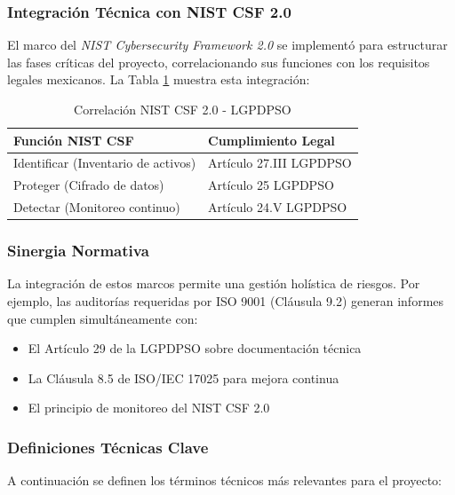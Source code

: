 \subsubsection{Integración Técnica con NIST CSF 2.0}  
El marco del \textit{NIST Cybersecurity Framework 2.0} se implementó para estructurar las fases críticas del proyecto, correlacionando sus funciones con los requisitos legales mexicanos. La Tabla \ref{tab:nist-lgpdpso} muestra esta integración:

\begin{table}[h]
	\centering
	\caption{Correlación NIST CSF 2.0 - LGPDPSO}
	\label{tab:nist-lgpdpso}
	\begin{tabularx}{\textwidth}{|>{\raggedright\arraybackslash}X|>{\raggedright\arraybackslash}X|}
		\hline
		\textbf{Función NIST CSF} & \textbf{Cumplimiento Legal} \\ \hline
		Identificar (Inventario de activos) & Artículo 27.III LGPDPSO \\ \hline
		Proteger (Cifrado de datos) & Artículo 25 LGPDPSO \\ \hline
		Detectar (Monitoreo continuo) & Artículo 24.V LGPDPSO \\ \hline
	\end{tabularx}
\end{table}


\subsubsection{Sinergia Normativa}  
La integración de estos marcos permite una gestión holística de riesgos. Por ejemplo, las auditorías  requeridas por ISO 9001 (Cláusula 9.2) generan informes que cumplen simultáneamente con:
\begin{itemize}
	\item El Artículo 29 de la LGPDPSO sobre documentación técnica
	\item La Cláusula 8.5 de ISO/IEC 17025 para mejora continua
	\item El principio de monitoreo del NIST CSF 2.0
\end{itemize}

\subsubsection{Definiciones Técnicas Clave}
A continuación se definen los términos técnicos más relevantes para el proyecto:

